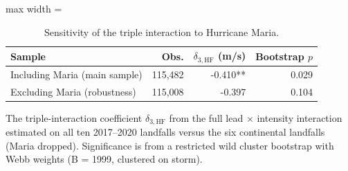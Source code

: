 \begin{table}

\caption{Sensitivity of the triple interaction to Hurricane Maria. \label{tab:precision_maria}}
\centering
\begin{adjustbox}{max width = \textwidth}
\begin{threeparttable}
\begin{tabular}[t]{lrrr}
\toprule
Sample & Obs. & $\delta_{3,\text{HF}}$ (m/s) & Bootstrap $p$\\
\midrule
Including Maria (main sample) & 115,482 & -0.410** & 0.029\\
Excluding Maria (robustness) & 115,008 & -0.397 & 0.104\\
\bottomrule
\end{tabular}
\begin{tablenotes}
\small
\item The triple-interaction coefficient $\delta_{3,\text{HF}}$ from the full lead $\times$ intensity interaction estimated on all ten 2017--2020 landfalls versus the six continental landfalls (Maria dropped). Significance is from a restricted wild cluster bootstrap with Webb weights (B = 1999, clustered on storm).
\end{tablenotes}
\end{threeparttable}
\end{adjustbox}
\end{table}
